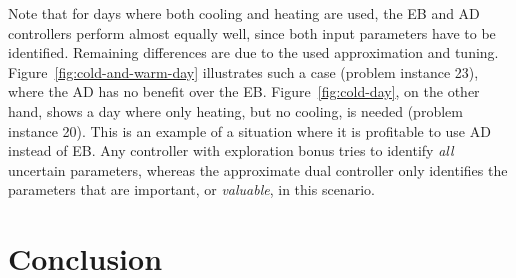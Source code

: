 Note that for days where both cooling and heating are used, the EB and AD
controllers perform almost equally well, since both input parameters have to be
identified. Remaining differences are due to the used approximation and tuning.
Figure~\ref{fig:cold-and-warm-day} illustrates such a case (problem instance
23), where the AD has no benefit over the EB. Figure~\ref{fig:cold-day}, on
the other hand, shows a day  where only heating, but no cooling, is needed
(problem instance 20). This is an example of a situation where it is profitable
to use AD instead of EB. Any controller with exploration bonus tries to identify
\emph{all} uncertain parameters, whereas the approximate dual controller only
identifies the parameters that are important, or \emph{valuable}, in this
scenario.

\begin{figure*}
  \setlength{\figurewidth}{0.95\columnwidth}
  \setlength{\figureheight}{5cm}
  \footnotesize
  \caption[Problem instance where both heating and cooling are used.]{Problem
instance where both heating and cooling are used (problem instance 23).
{\bfseries Top:} Room temperature (\ref*{p:building-room}), outer wall
temperature (\ref*{p:building-outer-wall}) and inner wall temperature
(\ref*{p:building-inner-wall}). The constraints are imposed on the room
temperature (\ref*{p:building-constraints}). {\bfseries Bottom:} Control inputs
for heating (\ref*{p:building-heating}) and cooling (\ref*{p:building-cooling}).
{\bfseries Left:} Exploration bonus controller. {\bfseries Right:} Dual
controller. }
  \label{fig:cold-and-warm-day}
\end{figure*}

\begin{figure*}
\vspace{30mm}
  \setlength{\figurewidth}{0.95\columnwidth}
  \setlength{\figureheight}{5cm}
  \footnotesize
  \caption[Problem instance where only heating is necessary.]{Problem instance
where only heating is necessary (problem instance 20). Colors and
controllers as in Figure~\ref{fig:cold-and-warm-day}. The pre-heating around 5
am is due to the lower energy price at this time.} \label{fig:cold-day}
\end{figure*}

\section{Conclusion}

